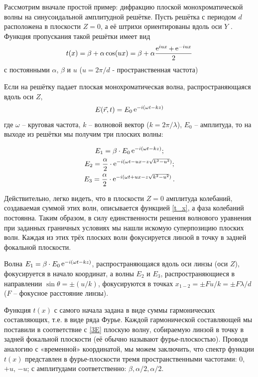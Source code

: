 \documentclass[a5paper,10pt, twoside]{article} %
\begin{document}
	Рассмотрим вначале простой пример: дифракцию плоской монохроматической волны на синусоидальной
	амплитудной решётке. Пусть решётка с периодом $d$ расположена в плоскости $Z = 0$, а её штрихи 
	ориентированы вдоль оси $Y$ . Функция пропускания такой решётки имеет вид
	\begin{equation}\label{t_x}
		t(x) = \beta + \alpha \cos (ux) = \beta + \alpha \frac{\mathop{\mathrm e}\nolimits^{iux} + \mathop{\mathrm e}\nolimits^{-iux}}{2}
	\end{equation}
	с постоянными $\alpha$, $\beta$ и $u$ ($u = 2 \pi / d$ - пространственная частота) 
	
	Если на решётку падает плоская монохроматическая волна, распространяющаяся вдоль оси $Z$,
	\begin{equation}
		E(\vec{r}, t) = E_0 \mathop{\mathrm e}\nolimits^{-i(\omega t - kz)}
	\end{equation}
	где $\omega$ -- круговая частота, $k$ -- волновой вектор ($k = 2\pi / \lambda$), $E_0$ -- 
	амплитуда, то на выходе из решётки мы получим три плоских волны:
	
	\begin{equation}\label{3E}
	\begin{gathered} 
		E_1 = \beta \cdot E_0 \mathop{\mathrm e}\nolimits^{-i(\omega t - kz)}; \\
		E_2 = \frac{\alpha}{2} \cdot \mathop{\mathrm e}\nolimits^{-i(\omega t - ux - z \sqrt{k^2-u^2})}; \\
		E_3 = \frac{\alpha}{2} \cdot \mathop{\mathrm e}\nolimits^{-i(\omega t + ux - z \sqrt{k^2-u^2})}.
	 \end{gathered}
	\end{equation}
	
	Действительно, легко видеть, что в плоскости $Z = 0$ амплитуда колебаний, создаваемая суммой 
	этих волн, описывается функцией \eqref{t_x}, а фаза колебаний постоянна. Таким образом, в силу 
	единственности решения волнового уравнения при заданных граничных условиях мы нашли искомую 
	суперпозицию плоских волн. Каждая из этих трёх плоских волн фокусируется линзой в точку в 
	задней фокальной плоскости.
	
	Волна $E_1 = \beta \cdot E_0 \mathop{\mathrm e}\nolimits^{-i(\omega t - kz)}$, распространяющаяся вдоль оси линзы 
	(оси $Z$), фокусируется в начало координат, а волны $E_2$ и $E_3$, распространяющиеся в 
	направлении $\sin{\theta} = \pm (u/k)$, фокусируются в точках 
	$x_{1-2} = \pm F u / k = \pm F \lambda / d$ ($F$ -- фокусное расстояние линзы).
	
	
	Функция $t(x)$ с самого начала задана в виде суммы гармонических составляющих, т.е. в виде 
	ряда Фурье. Каждой гармонической составляющей мы поставили в соответствие с \eqref{3E} 
	плоскую волну, собираемую линзой в точку в задней фокальной плоскости (её обычно называют 
	фурье-плоскостью). Проводя аналогию с «временной» координатой, мы можем заключить, что спектр 
	функции $t(x)$ представлен в фурье-плоскости тремя пространственными частотами: 0, $+u$, $-u$; 
	с амплитудами соответственно: $\beta, \alpha / 2, \alpha / 2$.
	
\end{document}
